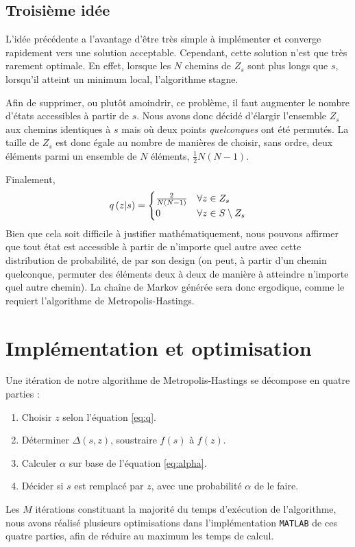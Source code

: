 \documentclass[a4paper, 12pt]{report}
\begin{document}
    \subsection{Troisième idée} \label{sec:troisieme_idee}
    L'idée précédente a l'avantage d'être très simple à implémenter et converge rapidement vers une solution acceptable. Cependant, cette solution n'est que très rarement optimale. En effet, lorsque les $N$ chemins de $Z_s$ sont plus longs que $s$, \cad{} lorsqu'il atteint un minimum local, l'algorithme stagne. \par
    Afin de supprimer, ou plutôt amoindrir, ce problème, il faut augmenter le nombre d'états accessibles à partir de $s$. Nous avons donc décidé d'élargir l'ensemble $Z_s$ aux chemins identiques à $s$ mais où deux points \emph{quelconques} ont été permutés. La taille de $Z_s$ est donc égale au nombre de manières de choisir, sans ordre, deux éléments parmi un ensemble de $N$ éléments, \cad{} $\frac{1}{2}N(N-1)$. \par
    Finalement,
    \begin{equation} \label{eq:q}
        q\left(z | s\right) =
        \begin{cases}
            \frac{2}{N(N-1)} & \forall z \in Z_s \\
            0 & \forall z \in S \setminus Z_s
        \end{cases}
    \end{equation}
    Bien que cela soit difficile à justifier mathématiquement, nous pouvons affirmer que tout état est accessible à partir de n'importe quel autre avec cette distribution de probabilité, de par son design (on peut, à partir d'un chemin quelconque, permuter des éléments deux à deux de manière à atteindre n'importe quel autre chemin). La chaîne de Markov générée sera donc ergodique, comme le requiert l'algorithme de Metropolis-Hastings.
	\section{Implémentation et optimisation}
	Une itération de notre algorithme de Metropolis-Hastings se décompose en quatre parties :
	\begin{enumerate}
	    \item Choisir $z$ selon l'équation \eqref{eq:q}.
	    \item Déterminer $\Delta(s, z)$, \cad{} soustraire $f(s)$ à $f(z)$.
        \item Calculer $\alpha$ sur base de l'équation \eqref{eq:alpha}.
        \item Décider si $s$ est remplacé par $z$, avec une probabilité $\alpha$ de le faire.
	\end{enumerate}
	Les $M$ itérations constituant la majorité du temps d'exécution de l'algorithme, nous avons réalisé plusieurs optimisations dans l'implémentation \texttt{MATLAB} de ces quatre parties, afin de réduire au maximum les temps de calcul.
\end{document}
